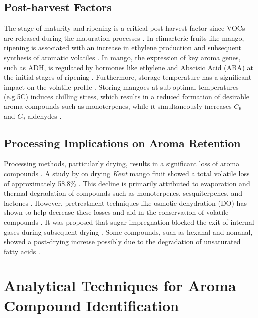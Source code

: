 \subsection{Post-harvest Factors}
The stage of maturity and ripening is a critical post-harvest factor since VOCs are released during the maturation processes \cite*{A01_Aguirre-Lopez_2023,A13_ElHadi2013}. In climacteric fruits like mango, ripening is associated with an increase in ethylene production and subsequent synthesis of aromatic volatiles \cite*{A05_Chin2019}. In mango, the expression of key aroma genes, such as ADH, is regulated by hormones like ethylene and Abscisic Acid (ABA) at the initial stages of ripening \cite*{A10_Singh2010}. Furthermore, storage temperature has a significant impact on the volatile profile \cite*{A13_ElHadi2013}. Storing mangoes at sub-optimal temperatures (e.g.5\textdegree C) induces chilling stress, which results in a reduced formation of desirable aroma compounds such as monoterpenes, while it simultaneously increases $C_6$ and $C_9$ aldehydes \cite*{A11_Sivankalyani2017}.


\subsection{Processing Implications on Aroma Retention}
Processing methods, particularly drying, results in a significant loss of aroma compounds \cite*{A07_Bonneau2016}. A study by \textcite{A07_Bonneau2016} on drying \textit{Kent} mango fruit showed a total volatile loss of approximately 58.8\% \cite*{A07_Bonneau2016,A16_Tandel2023}. This decline is primarily attributed to evaporation and thermal degradation of compounds such as monoterpenes, sesquiterpenes, and lactones \cite*{A07_Bonneau2016}. However, pretreatment techniques like osmotic dehydration (DO) has shown to help decrease these losses and aid in the conservation of volatile compounds \cite*{A02_Moreno2010}. It was proposed that sugar impregnation blocked the exit of internal gases during subsequent drying \cite*{A02_Moreno2010}. Some compounds, such as hexanal and nonanal, showed a post-drying increase possibly due to the degradation of unsaturated fatty acids \cite*{A07_Bonneau2016}.


\section{Analytical Techniques for Aroma Compound Identification}
